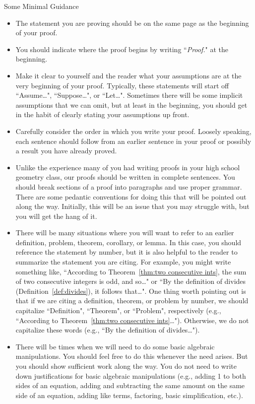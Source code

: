 \begin{section}{Some Minimal Guidance}
\begin{itemize}
\item The statement you are proving should be on the same page as the beginning of your proof.   
\item You should indicate where the proof begins by writing ``\emph{Proof.}" at the beginning.  
\item Make it clear to yourself and the reader what your assumptions are at the very beginning of your proof. Typically, these statements will start off ``Assume\ldots", ``Suppose\ldots", or ``Let\ldots".  Sometimes there will be some implicit assumptions that we can omit, but at least in the beginning, you should get in the habit of clearly stating your assumptions up front. 
\item Carefully consider the order in which you write your proof. Loosely speaking, each sentence should follow from an earlier sentence in your proof or possibly a result you have already proved.
\item Unlike the experience many of you had writing proofs in your high school geometry class, our proofs should be written in complete sentences.  You should break sections of a proof into paragraphs and use proper grammar.  There are some pedantic conventions for doing this that will be pointed out along the way.  Initially, this will be an issue that you may struggle with, but you will get the hang of it.
\item There will be many situations where you will want to refer to an earlier definition, problem, theorem, corollary, or lemma.  In this case, you should reference the statement by number, but it is also helpful to the reader to summarize the statement you are citing.  For example, you might write something like, ``According to Theorem~\ref{thm:two consecutive ints}, the sum of two consecutive integers is odd, and so\ldots" or ``By the definition of divides (Definition~\ref{def:divides}), it follows that\ldots". One thing worth pointing out is that if we are citing a definition, theorem, or problem by number, we should capitalize ``Definition", ``Theorem", or ``Problem", respectively (e.g., ``According to Theorem~\ref{thm:two consecutive ints}\ldots"). Otherwise, we do not capitalize these words (e.g., ``By the definition of divides\ldots").
\item There will be times when we will need to do some basic algebraic manipulations.  You should feel free to do this whenever the need arises.  But you should show sufficient work along the way.  You do not need to write down justifications for basic algebraic manipulations (e.g., adding 1 to both sides of an equation, adding and subtracting the same amount on the same side of an equation, adding like terms, factoring, basic simplification, etc.).  

\end{itemize}
\end{section}
